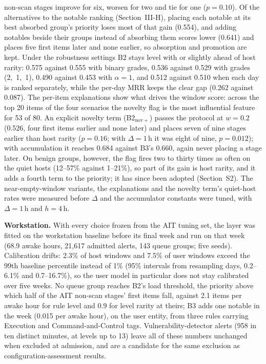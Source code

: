 \documentclass[conference]{IEEEtran}
\begin{document}
non-scan stages improve for six, worsen for two and tie for one ($p = 0.10$). Of the alternatives to the notable ranking (Section~III-H), placing each notable at its best absorbed group's priority loses most of that gain (0.554), and adding notables beside their groups instead of absorbing them scores lower (0.641) and places five first items later and none earlier, so absorption and promotion are kept. Under the robustness settings B2 stays level with or slightly ahead of host rarity: 0.575 against 0.555 with binary grades, 0.536 against 0.529 with grades (2,~1,~1), 0.490 against 0.453 with $\alpha = 1$, and 0.512 against 0.510 when each day is ranked separately, while the per-day MRR keeps the clear gap (0.262 against 0.087). The per-item explanations show what drives the window score: across the top 20 items of the four scenarios the novelty flag is the most influential feature for 53 of 80. An explicit novelty term (B2$_\mathrm{nov+}$) passes the protocol at $w = 0.2$ (0.526, four first items earlier and none later) and places seven of nine stages earlier than host rarity ($p = 0.16$; with $\Delta = 1$\,h it was eight of nine, $p = 0.012$); with accumulation it reaches 0.684 against B3's 0.660, again never placing a stage later. On benign groups, however, the flag fires two to thirty times as often on the quiet hosts (12--57\% against 1--21\%), so part of its gain is host rarity, and it adds a fourth term to the priority; it has since been adopted (Section~S2). The near-empty-window variants, the explanations and the novelty term's quiet-host rates were measured before $\Delta$ and the accumulator constants were tuned, with $\Delta = 1$\,h and $h = 4$\,h.

\textbf{Workstation.} With every choice frozen from the AIT tuning set, the layer was fitted on the workstation baseline before its final week and run on that week (68.9 awake hours, 21{,}617 admitted alerts, 143 queue groups; five seeds). Calibration drifts: 2.3\% of host windows and 7.5\% of user windows exceed the 99th baseline percentile instead of 1\% (95\% intervals from resampling days, 0.2--6.1\% and 0.7--16.7\%), so the user model in particular does not stay calibrated over five weeks. No queue group reaches B2's load threshold, the priority above which half of the AIT non-scan stages' first items fall, against 2.1 items per awake hour for rule level and 0.9 for level rarity at theirs; B3 adds one notable in the week (0.015 per awake hour), on the user entity, from three rules carrying Execution and Command-and-Control tags. Vulnerability-detector alerts (958 in ten distinct minutes, at levels up to 13) leave all of these numbers unchanged when excluded at admission, and are a candidate for the same exclusion as configuration-assessment results.
\end{document}
